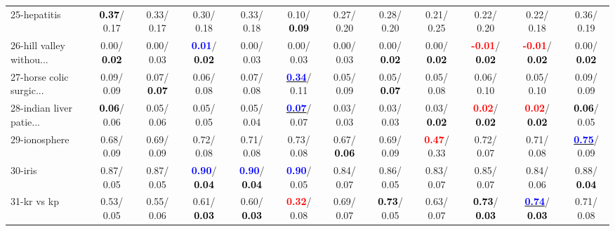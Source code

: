 \begin{table}[h]
\begin{center}
{\begin{tabular}{lc|c|c|c|c|c|c|c|c|c|c}
25-hepatitis & \textcolor{black}{\textbf{  0.37}}/  0.17 &   0.33/  0.17 &   0.30/  0.18 &   0.33/  0.18 &   0.10/\textcolor{black}{\textbf{  0.09}} &   0.27/  0.20 &   0.28/  0.20 &   0.21/  0.25 &   0.22/  0.20 &   0.22/  0.18 &   0.36/  0.19 \\
26-hill valley withou... &   0.00/\textcolor{black}{\textbf{  0.02}} &   0.00/  0.03 & \textcolor{blue}{\textbf{  0.01}}/\textcolor{black}{\textbf{  0.02}} &   0.00/  0.03 &   0.00/  0.03 &   0.00/  0.03 &   0.00/\textcolor{black}{\textbf{  0.02}} &   0.00/\textcolor{black}{\textbf{  0.02}} & \textcolor{red}{\textbf{ -0.01}}/\textcolor{black}{\textbf{  0.02}} & \textcolor{red}{\textbf{ -0.01}}/\textcolor{black}{\textbf{  0.02}} &   0.00/\textcolor{black}{\textbf{  0.02}} \\
27-horse colic surgic... &   0.09/  0.09 &   0.07/\textcolor{black}{\textbf{  0.07}} &   0.06/  0.08 &   0.07/  0.08 & \underline{\textcolor{blue}{\textbf{  0.34}}}/  0.11 &   0.05/  0.09 &   0.05/\textcolor{black}{\textbf{  0.07}} &   0.05/  0.08 &   0.06/  0.10 &   0.05/  0.10 &   0.09/  0.09 \\
28-indian liver patie... & \textcolor{black}{\textbf{  0.06}}/  0.06 &   0.05/  0.06 &   0.05/  0.05 &   0.05/  0.04 & \underline{\textcolor{blue}{\textbf{  0.07}}}/  0.07 &   0.03/  0.03 &   0.03/  0.03 &   0.03/\textcolor{black}{\textbf{  0.02}} & \textcolor{red}{\textbf{  0.02}}/\textcolor{black}{\textbf{  0.02}} & \textcolor{red}{\textbf{  0.02}}/\textcolor{black}{\textbf{  0.02}} & \textcolor{black}{\textbf{  0.06}}/  0.05 \\ \hline
29-ionosphere &   0.68/  0.09 &   0.69/  0.09 &   0.72/  0.08 &   0.71/  0.08 &   0.73/  0.08 &   0.67/\textcolor{black}{\textbf{  0.06}} &   0.69/  0.09 & \textcolor{red}{\textbf{  0.47}}/  0.33 &   0.72/  0.07 &   0.71/  0.08 & \underline{\textcolor{blue}{\textbf{  0.75}}}/  0.09 \\
30-iris &   0.87/  0.05 &   0.87/  0.05 & \textcolor{blue}{\textbf{  0.90}}/\textcolor{black}{\textbf{  0.04}} & \textcolor{blue}{\textbf{  0.90}}/\textcolor{black}{\textbf{  0.04}} & \textcolor{blue}{\textbf{  0.90}}/  0.05 &   0.84/  0.07 &   0.86/  0.05 &   0.83/  0.07 &   0.85/  0.07 &   0.84/  0.06 &   0.88/\textcolor{black}{\textbf{  0.04}} \\
31-kr vs kp &   0.53/  0.05 &   0.55/  0.06 &   0.61/\textcolor{black}{\textbf{  0.03}} &   0.60/\textcolor{black}{\textbf{  0.03}} & \textcolor{red}{\textbf{  0.32}}/  0.08 &   0.69/  0.07 & \textcolor{black}{\textbf{  0.73}}/  0.05 &   0.63/  0.07 & \textcolor{black}{\textbf{  0.73}}/\textcolor{black}{\textbf{  0.03}} & \underline{\textcolor{blue}{\textbf{  0.74}}}/\textcolor{black}{\textbf{  0.03}} &   0.71/  0.08 \\

\end{tabular}}
\end{center}
\end{table}
